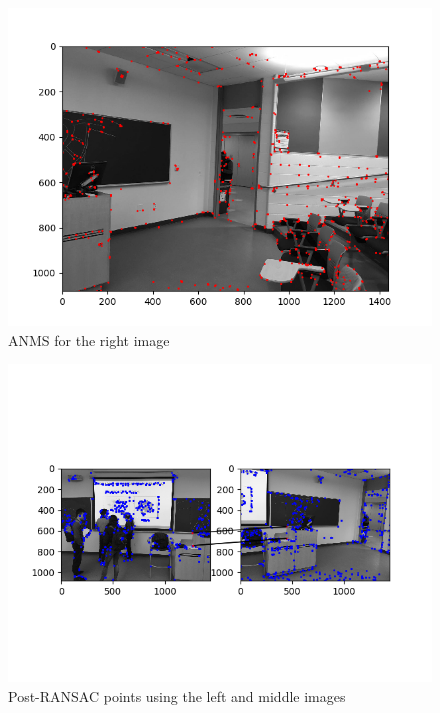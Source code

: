 \documentclass[10pt]{article}
\begin{document}
			\begin{figure}[h]
			\caption{ANMS for the right image}
			\centering
			\includegraphics{img/anmsR.png}
		\end{figure}
			
		\begin{figure}[h]
			\caption{Post-RANSAC points using the left and middle images}
			\centering
			\includegraphics{img/postranLM.png}
		\end{figure}
		
\end{document}
